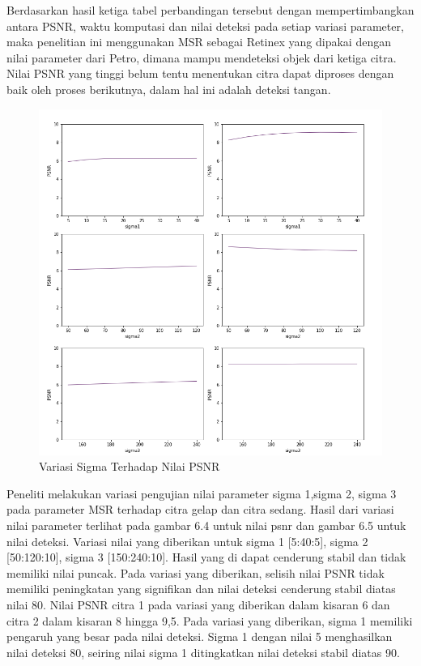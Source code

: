 Berdasarkan hasil ketiga tabel perbandingan tersebut dengan mempertimbangkan antara PSNR, waktu komputasi dan nilai deteksi pada setiap variasi parameter, maka penelitian ini menggunakan MSR sebagai Retinex yang dipakai dengan nilai parameter dari Petro, dimana mampu mendeteksi objek dari ketiga citra. Nilai PSNR yang tinggi belum tentu menentukan citra dapat diproses dengan baik oleh proses berikutnya, dalam hal ini adalah deteksi tangan.
\begin{figure}[H]
	\centering
	\includegraphics[width=0.7\linewidth]{sn}
	\caption{Variasi Sigma Terhadap Nilai PSNR}
	\label{fig:sn}
\end{figure}
Peneliti melakukan variasi pengujian nilai parameter sigma 1,sigma 2, sigma 3 pada parameter MSR terhadap citra gelap dan citra sedang. Hasil dari variasi nilai parameter terlihat pada gambar 6.4 untuk nilai psnr dan gambar 6.5 untuk nilai deteksi. Variasi nilai yang diberikan untuk sigma 1 [5:40:5], sigma 2 [50:120:10], sigma 3 [150:240:10]. Hasil yang di dapat cenderung stabil dan tidak memiliki nilai puncak. Pada variasi yang diberikan, selisih nilai PSNR tidak memiliki peningkatan yang signifikan dan nilai deteksi cenderung stabil diatas nilai 80. Nilai PSNR citra 1 pada variasi yang diberikan dalam kisaran 6 dan citra 2 dalam kisaran 8 hingga 9,5.
Pada variasi yang diberikan, sigma 1 memiliki pengaruh yang besar pada nilai deteksi. Sigma 1 dengan nilai 5 menghasilkan nilai deteksi 80, seiring nilai sigma 1 ditingkatkan nilai deteksi stabil diatas 90.
